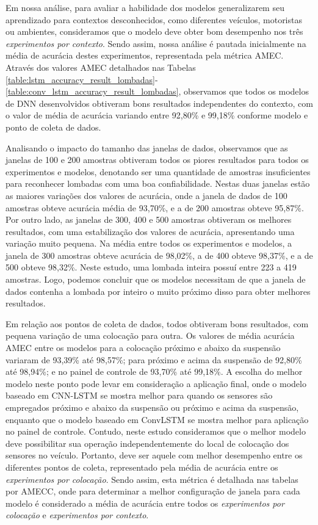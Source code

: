 Em nossa análise, para avaliar a habilidade dos modelos generalizarem seu aprendizado para contextos desconhecidos, como diferentes veículos, motoristas ou ambientes, consideramos que o modelo deve obter bom desempenho nos três \emph{experimentos por contexto}. Sendo assim, nossa análise é pautada inicialmente na média de acurácia destes experimentos, representada pela métrica AMEC. Através dos valores AMEC detalhados nas Tabelas \ref{table:lstm_accuracy_result_lombadas}-\ref{table:conv_lstm_accuracy_result_lombadas}, observamos que todos os modelos de DNN desenvolvidos obtiveram bons resultados independentes do contexto, com o valor de média de acurácia variando entre 92,80\% e 99,18\% conforme modelo e ponto de coleta de dados.

Analisando o impacto do tamanho das janelas de dados, observamos que as janelas de 100 e 200 amostras obtiveram todos os piores resultados para todos os experimentos e modelos, denotando ser uma quantidade de amostras insuficientes para reconhecer lombadas com uma boa confiabilidade. Nestas duas janelas estão as maiores variações dos valores de acurácia, onde a janela de dados de 100 amostras obteve acurácia média de 93,70\%, e a de 200 amostras obteve 95,87\%. Por outro lado, as janelas de 300, 400 e 500 amostras obtiveram os melhores resultados, com uma estabilização dos valores de acurácia, apresentando uma variação muito pequena. Na média entre todos os experimentos e modelos, a janela de 300 amostras obteve acurácia de 98,02\%, a de 400 obteve 98,37\%, e a de 500 obteve 98,32\%. Neste estudo, uma lombada inteira possuí entre 223 a 419 amostras. Logo, podemos concluir que os modelos necessitam de que a janela de dados contenha a lombada por inteiro o muito próximo disso para obter melhores resultados.

Em relação aos pontos de coleta de dados, todos obtiveram bons resultados, com pequena variação de uma colocação para outra. Os valores de média acurácia AMEC entre os modelos para a colocação próximo e abaixo da suspensão variaram de 93,39\% até 98,57\%; para próximo e acima da suspensão de 92,80\% até 98,94\%; e no painel de controle de 93,70\% até 99,18\%. A escolha do melhor modelo neste ponto pode levar em consideração a aplicação final, onde o modelo baseado em CNN-LSTM se mostra melhor para quando os sensores são empregados próximo e abaixo da suspensão ou próximo e acima da suspensão, enquanto que o modelo baseado em ConvLSTM se mostra melhor para aplicação no painel de controle. Contudo, neste estudo consideramos que o melhor modelo deve possibilitar sua operação independentemente do local de colocação dos sensores no veículo. Portanto, deve ser aquele com melhor desempenho entre os diferentes pontos de coleta, representado pela média de acurácia entre os \emph{experimentos por colocação}. Sendo assim, esta métrica é detalhada nas tabelas por AMECC, onde para determinar a melhor configuração de janela para cada modelo é considerado a média de acurácia entre todos os \emph{experimentos por colocação} e \emph{experimentos por contexto}.


